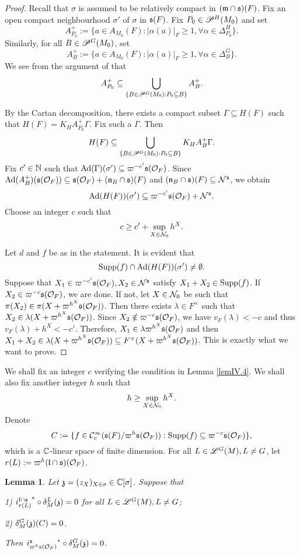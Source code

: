\documentclass[a4paper]{amsart}
\newcommand{\fm}{{\mathfrak{m}}} \newcommand{\fn}{{\mathfrak{n}}}\newcommand{\fo}{{\mathfrak{o}}} \newcommand{\fp}{{\mathfrak{p}}}
\newtheorem{lem}[thm]{Lemma}
\theoremstyle{definition}
\theoremstyle{remark}
\numberwithin{equation}{subsection}
\begin{document}
\begin{proof}
Recall that $\sigma$ is assumed to be relatively compact in $(\fm\cap\fs)(F)$. Fix an open compact neighbourhood $\sigma'$ of $\sigma$ in ${\mathfrak{s}}(F)$. Fix $P_0\in\mathscr{P}^H(M_0)$ and set
$$ A_{P_0}^+:=\{a\in A_{M_0}(F): |\alpha(a)|_F\geq 1, \forall \alpha\in\Delta_{P_0}^H\}. $$
Similarly, for all $B\in\mathscr{P}^G(M_0)$, set
$$ A_B^+:=\{a\in A_{M_0}(F): |\alpha(a)|_F\geq 1, \forall \alpha\in\Delta_B^G\}. $$
We see from the argument of \cite[Lemma 4.11]{zbMATH07499568} that
$$ A_{P_0}^+\subseteq \bigcup_{\{B\in\mathscr{P}^G(M_0): P_0\subseteq B\}} A_B^+. $$

By the Cartan decomposition, there exists a compact subset $\Gamma\subseteq H(F)$ such that $H(F)=K_H A_{P_0}^+\Gamma$. 
Fix such a $\Gamma$. Then
$$ H(F)\subseteq \bigcup_{\{B\in\mathscr{P}^G(M_0): P_0\subseteq B\}} K_H A_B^+ \Gamma. $$
Fix $c'\in{\mathbb {N}}$ such that ${\mathrm{Ad}}(\Gamma)(\sigma')\subseteq\varpi^{-c'}{\mathfrak{s}}({\mathcal {O}}_F)$. Since $\Ad(A_B^+)(\fs(\CO_F))\subseteq \fs(\CO_F)+(\fn_B\cap\fs)(F)$ and $(\fn_B\cap\fs)(F)\subseteq\CN^\fs$, we obtain
$$ {\mathrm{Ad}}(H(F))(\sigma')\subseteq\varpi^{-c'}{\mathfrak{s}}({\mathcal {O}}_F)+{\mathcal {N}}^{\mathfrak{s}}. $$
Choose an integer $c$ such that
$$ c\geq c'+\sup_{X\in{\mathcal {N}}_0} h^X. $$

Let $d$ and $f$ be as in the statement. It is evident that
$$ {\mathrm{Supp}}(f)\cap{\mathrm{Ad}}(H(F))(\sigma')\neq\emptyset. $$
Suppose that $X_1\in\varpi^{-c'}{\mathfrak{s}}({\mathcal {O}}_F), X_2\in{\mathcal {N}}^{\mathfrak{s}}$ satisfy $X_1+X_2\in{\mathrm{Supp}}(f)$. If $X_2\in\varpi^{-c}{\mathfrak{s}}({\mathcal {O}}_F)$, we are done. If not, let $X\in{\mathcal {N}}_0$ be such that $\pi(X_2)\in\pi(X+\varpi^{h^X}{\mathfrak{s}}({\mathcal {O}}_F))$. Then there exists $\lambda\in F^\times$ such that $X_2\in\lambda(X+\varpi^{h^X}{\mathfrak{s}}({\mathcal {O}}_F))$. Since $X_2\notin\varpi^{-c}{\mathfrak{s}}({\mathcal {O}}_F)$, we have $v_F(\lambda)<-c$ and thus $v_F(\lambda)+h^X<-c'$. Therefore, $X_1\in\lambda\varpi^{h^X}{\mathfrak{s}}({\mathcal {O}}_F)$ and then $X_1+X_2\in\lambda(X+\varpi^{h^X}{\mathfrak{s}}({\mathcal {O}}_F))\subseteq F^\times(X+\varpi^{h^X}{\mathfrak{s}}({\mathcal {O}}_F))$. This is exactly what we want to prove. 
\end{proof}

We shall fix an integer $c$ verifying the condition in Lemma \ref{lemIV.4}. We shall also fix another integer $h$ such that
\begin{equation}\label{condonh}
 h\geq\sup_{X\in{\mathcal {N}}_0} h^X. 
\end{equation}
Denote
$$ C:=\{f\in{\mathcal {C}}_c^\infty({\mathfrak{s}}(F)/\varpi^h{\mathfrak{s}}({\mathcal {O}}_F)): {\mathrm{Supp}}(f)\subseteq\varpi^{-c}{\mathfrak{s}}({\mathcal {O}}_F)\}, $$
which is a ${\mathbb {C}}$-linear space of finite dimension. For all $L\in\mathscr{L}^G(M), L\neq G$, let $r(L):=\varpi^h({\mathfrak{l}}\cap{\mathfrak{s}})({\mathcal {O}}_F)$. 

\begin{lem}\label{lemIV.5}
Let ${\mathfrak{z}}=(z_X)_{X\in\sigma}\in{\mathbb {C}}[\sigma]$. Suppose that

1) ${i_{r(L)}^{{\mathfrak{l}}\cap{\mathfrak{s}}}}^*\circ\delta_M^L({\mathfrak{z}})=0$ for all $L\in\mathscr{L}^G(M), L\neq G$;

2) $\delta_M^G({\mathfrak{z}})(C)=0$. 

Then ${i_{\varpi^h{\mathfrak{s}}({\mathcal {O}}_F)}^{\mathfrak{s}}}^*\circ\delta_M^G({\mathfrak{z}})=0$. 
\end{lem}
\end{document}
